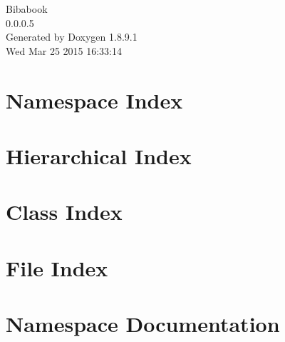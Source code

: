 \documentclass[twoside]{book}
\newcommand{\+}{\discretionary{\mbox{\scriptsize$\hookleftarrow$}}{}{}}
\newcommand{\clearemptydoublepage}{%
  \newpage{\pagestyle{empty}\cleardoublepage}%
}
\begin{document}
\hypersetup{pageanchor=false,
             bookmarks=true,
             bookmarksnumbered=true,
             pdfencoding=unicode
            }
\begin{titlepage}
\vspace*{7cm}
\begin{center}%
{\Large Bibabook \\[1ex]\large 0.\+0.\+0.\+5 }\\
\vspace*{1cm}
{\large Generated by Doxygen 1.8.9.1}\\
\vspace*{0.5cm}
{\small Wed Mar 25 2015 16:33:14}\\
\end{center}
\end{titlepage}
\clearemptydoublepage
\tableofcontents
\clearemptydoublepage
{}
\hypersetup{pageanchor=true}

\chapter{Namespace Index}

\chapter{Hierarchical Index}

\chapter{Class Index}

\chapter{File Index}

\chapter{Namespace Documentation}























\end{document}
